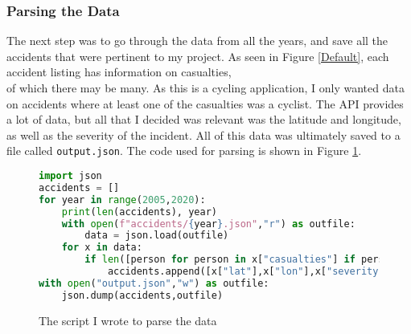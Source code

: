 \subsubsection{Parsing the Data}
The next step was to go through the data from all the years, and save all the accidents that were pertinent to my project. As seen in Figure \ref{Default}, each accident listing has information on casualties,\\
of which there may be many. As this is a cycling application, I only wanted data on accidents where at least one of the casualties was a cyclist. The API provides a lot of data, but all that I decided was relevant was
the latitude and longitude, as well as the severity of the incident. All of this data was ultimately saved to a file called \texttt{output.json}.
 The code used for parsing is shown in Figure \ref{Download.py}.
\begin{figure}[t]
    \begin{lstlisting}[language=Python]
import json
accidents = []
for year in range(2005,2020):
    print(len(accidents), year)
    with open(f"accidents/{year}.json","r") as outfile:
        data = json.load(outfile)
    for x in data:
        if len([person for person in x["casualties"] if person["mode"] == "PedalCycle"]) >= 1:
            accidents.append([x["lat"],x["lon"],x["severity"]])
with open("output.json","w") as outfile:
    json.dump(accidents,outfile)
    \end{lstlisting}
\caption{The script I wrote to parse the data}
\label{Download.py}
\end{figure}
\label{end}